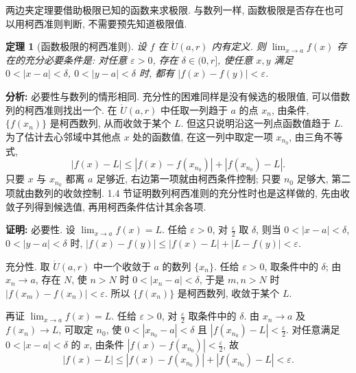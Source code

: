 \documentclass[UTF8,openany]{ctexbook}
\theoremstyle{chinesetextbook}
\newtheorem{theorem}{定理}[section]
\newenvironment{cnproof}{\par\indent\textbf{证明:} \ignorespaces}{\par}
\begin{document}
两边夹定理要借助极限已知的函数来求极限. 与数列一样, 函数极限是否存在也可以用柯西准则判断, 不需要预先知道极限值.
\begin{theorem}[函数极限的柯西准则]
设 $f$ 在 $\mathring U(a,r)$ 内有定义. 则 $\displaystyle\lim_{x\to a}f(x)$ 存在的充分必要条件是: 对任意 $\varepsilon>0$, 存在 $\delta\in(0,r]$, 使任意 $x,y$ 满足 $0<|x-a|<\delta$, $0<|y-a|<\delta$ 时, 都有 $|f(x)-f(y)|<\varepsilon$.
\end{theorem}
\par\indent\textbf{分析:} 必要性与数列的情形相同. 充分性的困难同样是没有候选的极限值, 可以借数列的柯西准则找出一个. 在 $\mathring U(a,r)$ 中任取一列趋于 $a$ 的点 $x_n$, 由条件, $\{f(x_n)\}$ 是柯西数列, 从而收敛于某个 $L$. 但这只说明沿这一列点函数值趋于 $L$. 为了估计去心邻域中其他点 $x$ 处的函数值, 在这一列中取定一项 $x_{n_0}$, 由三角不等式,
\[
|f(x)-L|\le|f(x)-f(x_{n_0})|+|f(x_{n_0})-L|.
\]
只要 $x$ 与 $x_{n_0}$ 都离 $a$ 足够近, 右边第一项就由柯西条件控制; 只要 $n_0$ 足够大, 第二项就由数列的收敛控制. 1.4 节证明数列柯西准则的充分性时也是这样做的, 先由收敛子列得到候选值, 再用柯西条件估计其余各项.
\begin{cnproof}
必要性. 设 $\displaystyle\lim_{x\to a}f(x)=L$. 任给 $\varepsilon>0$, 对 $\displaystyle\frac\varepsilon2$ 取 $\delta$, 则当 $0<|x-a|<\delta$, $0<|y-a|<\delta$ 时, $|f(x)-f(y)|\le|f(x)-L|+|L-f(y)|<\varepsilon$.

充分性. 取 $\mathring U(a,r)$ 中一个收敛于 $a$ 的数列 $\{x_n\}$. 任给 $\varepsilon>0$, 取条件中的 $\delta$; 由 $x_n\to a$, 存在 $N$, 使 $n>N$ 时 $0<|x_n-a|<\delta$, 于是 $m,n>N$ 时 $|f(x_m)-f(x_n)|<\varepsilon$. 所以 $\{f(x_n)\}$ 是柯西数列, 收敛于某个 $L$.

再证 $\displaystyle\lim_{x\to a}f(x)=L$. 任给 $\varepsilon>0$, 对 $\displaystyle\frac\varepsilon2$ 取条件中的 $\delta$. 由 $x_n\to a$ 及 $f(x_n)\to L$, 可取定 $n_0$, 使 $0<|x_{n_0}-a|<\delta$ 且 $\displaystyle|f(x_{n_0})-L|<\frac\varepsilon2$. 对任意满足 $0<|x-a|<\delta$ 的 $x$, 由条件 $\displaystyle|f(x)-f(x_{n_0})|<\frac\varepsilon2$, 故
\[
|f(x)-L|\le|f(x)-f(x_{n_0})|+|f(x_{n_0})-L|<\varepsilon.
\]
\end{cnproof}
\end{document}
